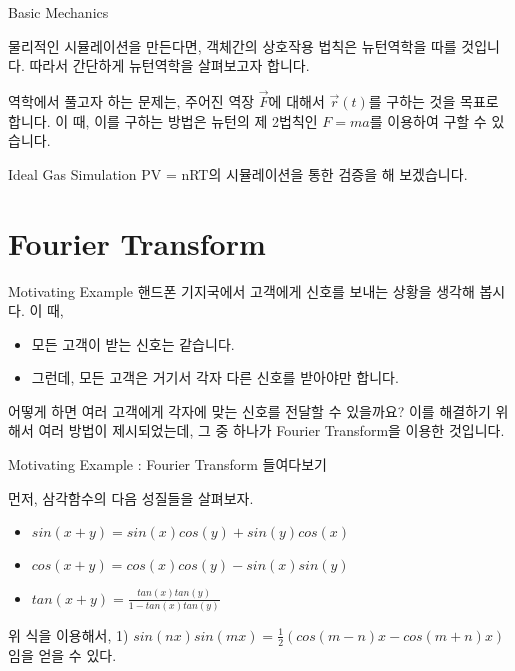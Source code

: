 \documentclass{beamer}
\begin{document}
\begin{frame}{Basic Mechanics}

물리적인 시뮬레이션을 만든다면, 객체간의 상호작용 법칙은 뉴턴역학을 따를 것입니다. 따라서 간단하게 뉴턴역학을 살펴보고자 합니다. 

역학에서 풀고자 하는 문제는, 주어진 역장 $\vec{F}$에 대해서 $\vec{r}(t)$를 구하는 것을 목표로 합니다. 이 때, 이를 구하는 방법은 뉴턴의 제 2법칙인 $F = ma$를 이용하여 구할 수 있습니다. 

\end{frame}

\begin{frame}{Ideal Gas Simulation}
PV = nRT의 시뮬레이션을 통한 검증을 해 보겠습니다. 
\end{frame}


\section{Fourier Transform}

\begin{frame}{Motivating Example} 
핸드폰 기지국에서 고객에게 신호를 보내는 상황을 생각해 봅시다. 이 때, 

\begin{itemize} 
\item 모든 고객이 받는 신호는 같습니다. 
\item 그런데, 모든 고객은 거기서 각자 다른 신호를 받아야만 합니다. 
\end{itemize}

어떻게 하면 여러 고객에게 각자에 맞는 신호를 전달할 수 있을까요? 이를 해결하기 위해서 여러 방법이 제시되었는데, 그 중 하나가 Fourier Transform을 이용한 것입니다. 
\end{frame}

\begin{frame}{Motivating Example : Fourier Transform 들여다보기} 

먼저, 삼각함수의 다음 성질들을 살펴보자. 

\begin{itemize}
\item $sin(x+y) = sin(x)cos(y) + sin(y)cos(x)$
\item $cos(x+y) = cos(x)cos(y) - sin(x)sin(y)$
\item $tan(x+y) = \frac{tan(x)tan(y)}{1-tan(x)tan(y)}$
\end{itemize}

위 식을 이용해서, 1) $sin(nx)sin(mx) = \frac{1}{2} (cos(m-n)x - cos(m+n)x)$임을 얻을 수 있다. 

\end{frame}
\end{document}
